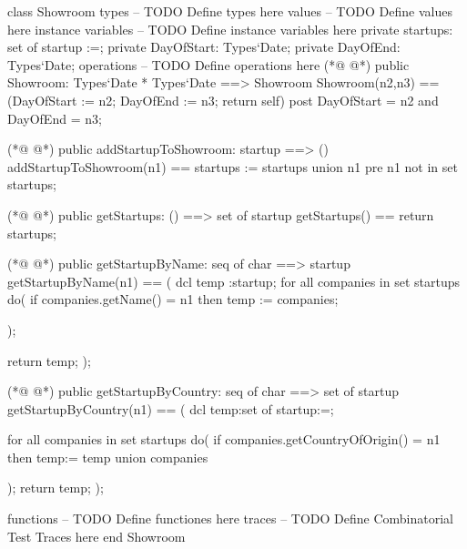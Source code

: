 \begin{vdmpp}[breaklines=true]
class Showroom
types
-- TODO Define types here
values
-- TODO Define values here
instance variables
-- TODO Define instance variables here
  private startups: set of startup :={};
  private DayOfStart: Types`Date;
  private DayOfEnd: Types`Date;
operations
-- TODO Define operations here
(*@
\label{Showroom:13}
@*)
  public Showroom:  Types`Date * Types`Date ==> Showroom
 Showroom(n2,n3) == (DayOfStart := n2; DayOfEnd := n3; return self)
 post DayOfStart = n2 and DayOfEnd = n3;
 
(*@
\label{addStartupToShowroom:17}
@*)
 public addStartupToShowroom: startup ==> ()
 addStartupToShowroom(n1) == startups := startups union {n1}
 pre n1 not in set startups;
 
(*@
\label{getStartups:21}
@*)
 public getStartups: () ==> set of startup
 getStartups() == return startups;
 
(*@
\label{getStartupByName:24}
@*)
 public getStartupByName: seq of char ==> startup
 getStartupByName(n1) == (
 dcl temp :startup;
    for all companies in set startups do(
    if companies.getName() = n1
    then temp := companies;
    
    
    );
    
    return temp;
 );
 
(*@
\label{getStartupByCountry:37}
@*)
  public getStartupByCountry: seq of char ==> set of startup
 getStartupByCountry(n1) == (
    dcl temp:set of startup:={};
    
    for all companies in set startups do(
    if companies.getCountryOfOrigin() = n1
    then temp:= temp union {companies}
    
    );
    return temp;
 );
 
functions
-- TODO Define functiones here
traces
-- TODO Define Combinatorial Test Traces here
end Showroom
\end{vdmpp}
